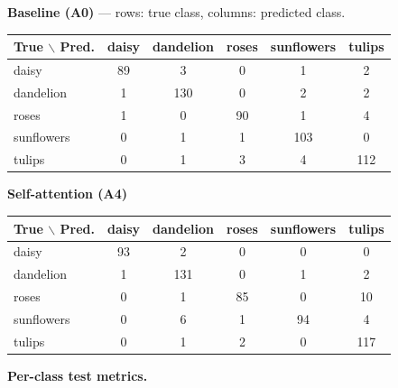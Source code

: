 \documentclass[10pt]{article}
\begin{document}
\textbf{Baseline (A0)} --- rows: true class, columns: predicted class.

\begin{center}
\begin{tabular}{|l|c|c|c|c|c|}
\hline
\textbf{True $\backslash$ Pred.} & \textbf{daisy} & \textbf{dandelion} & \textbf{roses} & \textbf{sunflowers} & \textbf{tulips} \\
\hline
daisy & 89 & 3 & 0 & 1 & 2 \\
\hline
dandelion & 1 & 130 & 0 & 2 & 2 \\
\hline
roses & 1 & 0 & 90 & 1 & 4 \\
\hline
sunflowers & 0 & 1 & 1 & 103 & 0 \\
\hline
tulips & 0 & 1 & 3 & 4 & 112 \\
\hline
\end{tabular}
\end{center}

\textbf{Self-attention (A4)}

\begin{center}
\begin{tabular}{|l|c|c|c|c|c|}
\hline
\textbf{True $\backslash$ Pred.} & \textbf{daisy} & \textbf{dandelion} & \textbf{roses} & \textbf{sunflowers} & \textbf{tulips} \\
\hline
daisy & 93 & 2 & 0 & 0 & 0 \\
\hline
dandelion & 1 & 131 & 0 & 1 & 2 \\
\hline
roses & 0 & 1 & 85 & 0 & 10 \\
\hline
sunflowers & 0 & 6 & 1 & 94 & 4 \\
\hline
tulips & 0 & 1 & 2 & 0 & 117 \\
\hline
\end{tabular}
\end{center}

\textbf{Per-class test metrics.}

\begin{center}
\end{center}
\end{document}
